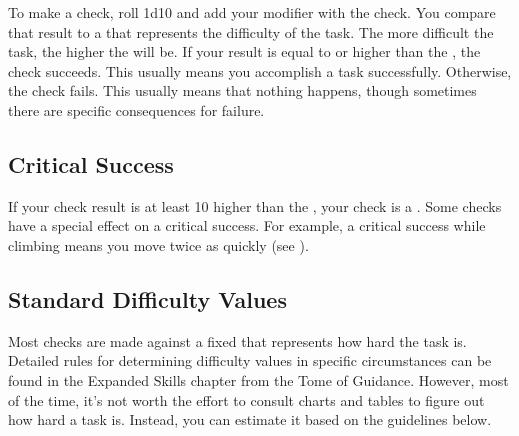   To make a check, roll 1d10 and add your modifier with the check.
  You compare that result to a  that represents the difficulty of the task.
  The more difficult the task, the higher the  will be.
  If your result is equal to or higher than the , the check succeeds.
  This usually means you accomplish a task successfully.
  Otherwise, the check fails.
  This usually means that nothing happens, though sometimes there are specific consequences for failure.

  \subsection{Critical Success}
    If your check result is at least 10 higher than the , your check is a .
    Some checks have a special effect on a critical success.
    For example, a critical success while climbing means you move twice as quickly (see ).

  \subsection{Standard Difficulty Values}\label{Standard Difficulty Values}
    Most checks are made against a fixed  that represents how hard the task is.
    Detailed rules for determining difficulty values in specific circumstances can be found in the Expanded Skills chapter from the Tome of Guidance.
    However, most of the time, it's not worth the effort to consult charts and tables to figure out how hard a task is.
    Instead, you can estimate it based on the guidelines below.

